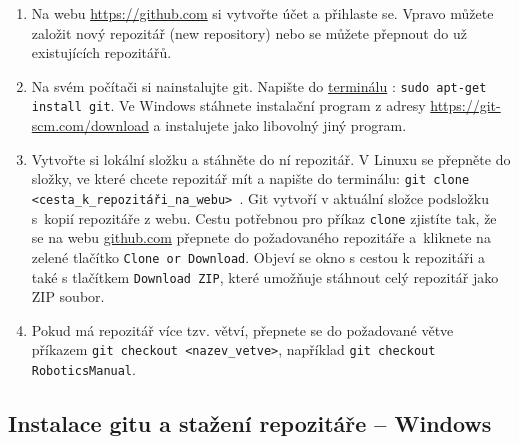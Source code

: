 \begin{enumerate}
	\item Na webu \url{https://github.com} si vytvořte účet a přihlaste se. 
	Vpravo můžete založit nový repozitář (new repository) nebo se můžete přepnout do už existujících repozitářů. 
	
	\item Na svém počítači si nainstalujte git. Napište do 
	\hyperref[terminal]{terminálu} : {\tt sudo apt-get install git}. 
	Ve Windows stáhnete instalační program z adresy 
	\url{https://git-scm.com/download} a instalujete jako libovolný jiný program. 
	
	\item Vytvořte si lokální složku a stáhněte do ní repozitář.  
	V Linuxu se přepněte do složky, ve které chcete repozitář mít a napište do terminálu: 
	{\tt git clone <cesta\_k\_repozitáři\_na\_webu> }. 
	 Git vytvoří v aktuální složce podsložku s~kopií repozitáře z webu.  
	Cestu potřebnou pro příkaz {\tt clone} zjistíte tak, 
	že se na webu \url{github.com} přepnete do požadovaného repozitáře a~kliknete na zelené tlačítko {\tt Clone or Download}.
	Objeví se okno s cestou k repozitáři a také s tlačítkem {\tt Download ZIP}, které umožňuje stáhnout celý repozitář jako ZIP soubor.
		 
	\item Pokud má repozitář více tzv. větví, přepnete se do požadované větve příkazem 
	{\tt git checkout <nazev\_vetve>}, například {\tt git checkout RoboticsManual}.
\end{enumerate}

\subsection{Instalace gitu a stažení repozitáře -- Windows}

